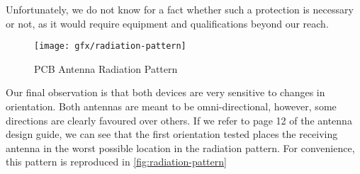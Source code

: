 Unfortunately, we do not know for a fact whether such a protection is necessary
or not, as it would require equipment and qualifications beyond our reach. 

\begin{figure}[htb]
  \begin{center}
    \texttt{[image: gfx/radiation-pattern]}
  \end{center}
  \caption{PCB Antenna Radiation Pattern\citep{AN3359}}
  \label{fig:radiation-pattern}
\end{figure}

Our final observation is that both devices are very sensitive to changes in
orientation. Both antennas are meant to be omni-directional, however, some
directions are clearly favoured over others. If we refer to page 12 of the
antenna design guide\citep{AN3359}, we can see that the first orientation tested
places the receiving antenna in the worst possible location in the radiation
pattern. For convenience, this pattern is reproduced in
\autoref{fig:radiation-pattern}

